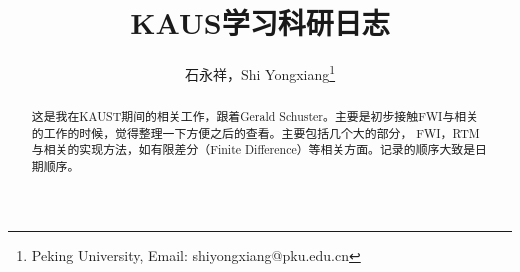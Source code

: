 \documentclass[UTF8, 10pt, a4paper]{article}
\title{KAUS学习科研日志}
\author{石永祥，Shi Yongxiang\footnote{Peking University, Email: shiyongxiang@pku.edu.cn}}
\begin{document}
    \maketitle
    \begin{abstract}
        这是我在KAUST期间的相关工作，跟着Gerald Schuster。主要是初步接触FWI与相关的工作的时候，觉得整理一下方便之后的查看。主要包括几个大的部分， FWI，RTM与相关的实现方法，如有限差分（Finite Difference）等相关方面。记录的顺序大致是日期顺序。
    \end{abstract}
    
    
    
\end{document}
